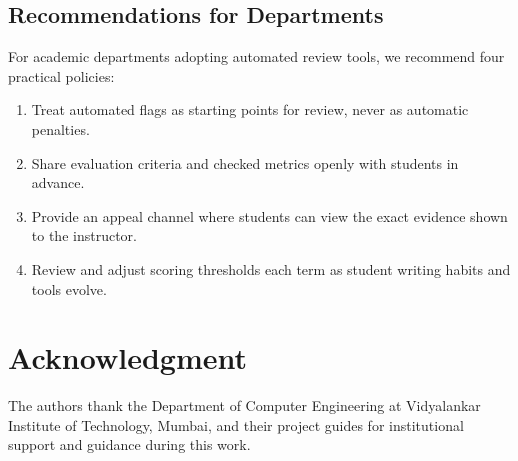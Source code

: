 \documentclass[conference]{IEEEtran}
\begin{document}
\subsection{Recommendations for Departments}
For academic departments adopting automated review tools, we recommend four practical policies:
\begin{enumerate}
    \item Treat automated flags as starting points for review, never as automatic penalties.
    \item Share evaluation criteria and checked metrics openly with students in advance.
    \item Provide an appeal channel where students can view the exact evidence shown to the instructor.
    \item Review and adjust scoring thresholds each term as student writing habits and tools evolve.
\end{enumerate}

\section*{Acknowledgment}
The authors thank the Department of Computer Engineering at Vidyalankar Institute of Technology, Mumbai, and their project guides for institutional support and guidance during this work.
\end{document}
